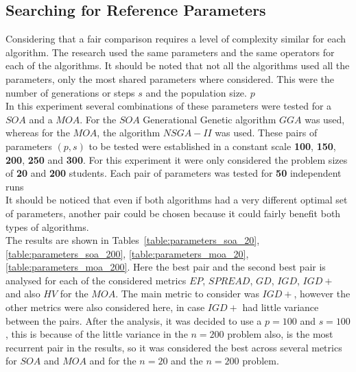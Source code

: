 \subsection{Searching for Reference Parameters}

Considering that a fair comparison requires a level of complexity similar for each algorithm. The research used the same parameters and the same operators for each of the algorithms. It should be noted that not all the algorithms used all the parameters, only the most shared parameters where considered. This were the number of generations or steps $s$ and the population size. $p$ \\

In this experiment several combinations of these parameters were tested for a $SOA$ and a $MOA$. For the $SOA$ Generational Genetic algorithm $GGA$ was used, whereas for the $MOA$, the algorithm $NSGA-II$ was used. These pairs of parameters $(p,s)$ to be tested were established in a constant scale \textbf{100}, \textbf{150}, \textbf{200}, \textbf{250} and \textbf{300}. For this experiment it were only considered the problem sizes of \textbf{20} and \textbf{200} students. Each pair of parameters was tested for \textbf{50} independent runs\\

It should be noticed that even if both algorithms had a very different optimal set of parameters, another pair could be chosen because it could fairly benefit both types of algorithms. \\

The results are shown in Tables~\ref{table:parameters_soa_20}, \ref{table:parameters_soa_200}, \ref{table:parameters_moa_20}, \ref{table:parameters_moa_200}. Here the best pair and the second best pair is analysed for each of the considered metrics $EP$, $SPREAD$, $GD$, $IGD$, $IGD+$ and also $HV$ for the $MOA$. The main metric to consider was $IGD+$, however the other metrics were also considered here, in case $IGD+$ had little variance between the pairs. After the analysis, it was decided to use a $p=100$ and $s=100$, this is because of the little variance in the $n=200$ problem also, is the most recurrent pair in the results, so it was considered the best across several metrics for $SOA$ and $MOA$ and for the $n=20$ and the $n=200$ problem.

